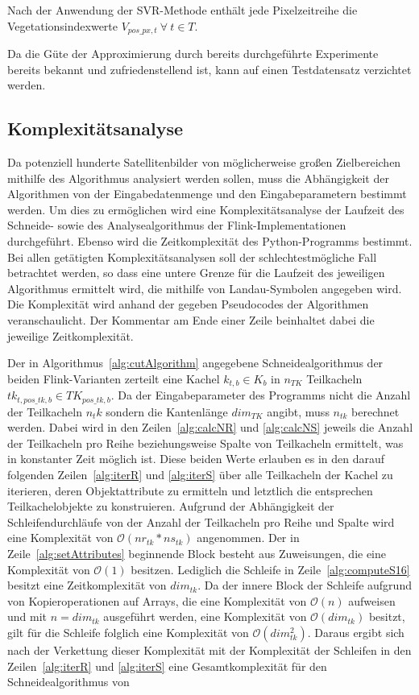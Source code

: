 Nach der Anwendung der SVR-Methode enthält jede Pixelzeitreihe die Vegetationsindexwerte $V_{pos\_px, t}\ \forall\ t \in T$. 

Da die Güte der Approximierung durch bereits durchgeführte Experimente bereits bekannt und zufriedenstellend ist, kann auf einen Testdatensatz verzichtet werden.

\subsection{Komplexitätsanalyse}
\label{sec:ComplexityAnalysis}
Da potenziell hunderte Satellitenbilder von möglicherweise großen Zielbereichen mithilfe des Algorithmus analysiert werden sollen, muss die Abhängigkeit der Algorithmen von der Eingabedatenmenge und den Eingabeparametern bestimmt werden. Um dies zu ermöglichen wird eine Komplexitätsanalyse der Laufzeit des Schneide- sowie des Analysealgorithmus der Flink-Implementationen durchgeführt. Ebenso wird die Zeitkomplexität des Python-Programms bestimmt. Bei allen getätigten Komplexitätsanalysen soll der schlechtestmögliche Fall betrachtet werden, so dass eine untere Grenze für die Laufzeit des jeweiligen Algorithmus ermittelt wird, die mithilfe von Landau-Symbolen angegeben wird. Die Komplexität wird anhand der gegeben Pseudocodes der Algorithmen veranschaulicht. Der Kommentar am Ende einer Zeile beinhaltet dabei die jeweilige Zeitkomplexität. 

Der in Algorithmus~\ref{alg:cutAlgorithm} angegebene Schneidealgorithmus der beiden Flink-Varianten zerteilt eine Kachel $k_{t, b} \in K_{b}$ in $n_{TK}$ Teilkacheln $tk_{t, pos\_tk, b} \in TK_{pos\_tk, b}$. Da der Eingabeparameter des Programms nicht die Anzahl der Teilkacheln $n_tk$ sondern die Kantenlänge $dim_{TK}$ angibt, muss $n_{tk}$ berechnet werden. Dabei wird in den Zeilen~\ref{alg:calcNR} und \ref{alg:calcNS} jeweils die Anzahl der Teilkacheln pro Reihe beziehungsweise Spalte von Teilkacheln ermittelt, was in konstanter Zeit möglich ist. Diese beiden Werte erlauben es in den darauf folgenden Zeilen~\ref{alg:iterR} und \ref{alg:iterS} über alle Teilkacheln der Kachel zu iterieren, deren Objektattribute zu ermitteln und letztlich die entsprechen Teilkachelobjekte zu konstruieren. Aufgrund der Abhängigkeit der Schleifendurchläufe von der Anzahl der Teilkacheln pro Reihe und Spalte wird eine Komplexität von $\mathcal{O}(nr_{tk} * ns_{tk})$ angenommen. Der in Zeile~\ref{alg:setAttributes} beginnende Block besteht aus Zuweisungen, die eine Komplexität von $\mathcal{O}(1)$ besitzen. Lediglich die Schleife in Zeile~\ref{alg:computeS16} besitzt eine Zeitkomplexität von $dim_{tk}$. Da der innere Block der Schleife aufgrund von Kopieroperationen auf Arrays, die eine Komplexität von $\mathcal{O}(n)$ aufweisen und mit $n = dim_{tk}$ ausgeführt werden, eine Komplexität von $\mathcal{O}(dim_{tk})$ besitzt, gilt für die Schleife folglich eine Komplexität von $\mathcal{O}(dim_{tk}^2)$. Daraus ergibt sich nach der Verkettung dieser Komplexität mit der Komplexität der Schleifen in den Zeilen~\ref{alg:iterR} und \ref{alg:iterS} eine Gesamtkomplexität für den Schneidealgorithmus von 

